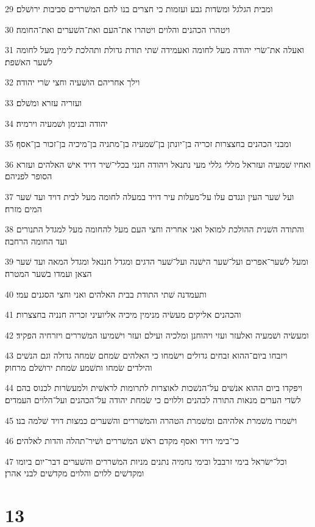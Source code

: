 \par 29 ומבית הגלגל ומשׂדות גבע ועזמות כי חצרים בנו להם המשׁררים סביבות ירושׁלם׃
\par 30 ויטהרו הכהנים והלוים ויטהרו את־העם ואת־השׁערים ואת־החומה׃
\par 31 ואעלה את־שׂרי יהודה מעל לחומה ואעמידה שׁתי תודת גדולת ותהלכת לימין מעל לחומה לשׁער האשׁפת׃
\par 32 וילך אחריהם הושׁעיה וחצי שׂרי יהודה׃
\par 33 ועזריה עזרא ומשׁלם׃
\par 34 יהודה ובנימן ושׁמעיה וירמיה׃
\par 35 ומבני הכהנים בחצצרות זכריה בן־יונתן בן־שׁמעיה בן־מתניה בן־מיכיה בן־זכור בן־אסף׃
\par 36 ואחיו שׁמעיה ועזראל מללי גללי מעי נתנאל ויהודה חנני בכלי־שׁיר דויד אישׁ האלהים ועזרא הסופר לפניהם׃
\par 37 ועל שׁער העין ונגדם עלו על־מעלות עיר דויד במעלה לחומה מעל לבית דויד ועד שׁער המים מזרח׃
\par 38 והתודה השׁנית ההולכת למואל ואני אחריה וחצי העם מעל להחומה מעל למגדל התנורים ועד החומה הרחבה׃
\par 39 ומעל לשׁער־אפרים ועל־שׁער הישׁנה ועל־שׁער הדגים ומגדל חננאל ומגדל המאה ועד שׁער הצאן ועמדו בשׁער המטרה׃
\par 40 ותעמדנה שׁתי התודת בבית האלהים ואני וחצי הסגנים עמי׃
\par 41 והכהנים אליקים מעשׂיה מנימין מיכיה אליועיני זכריה חנניה בחצצרות׃
\par 42 ומעשׂיה ושׁמעיה ואלעזר ועזי ויהוחנן ומלכיה ועילם ועזר וישׁמיעו המשׁררים ויזרחיה הפקיד׃
\par 43 ויזבחו ביום־ההוא זבחים גדולים וישׂמחו כי האלהים שׂמחם שׂמחה גדולה וגם הנשׁים והילדים שׂמחו ותשׁמע שׂמחת ירושׁלם מרחוק׃
\par 44 ויפקדו ביום ההוא אנשׁים על־הנשׁכות לאוצרות לתרומות לראשׁית ולמעשׂרות לכנוס בהם לשׂדי הערים מנאות התורה לכהנים וללוים כי שׂמחת יהודה על־הכהנים ועל־הלוים העמדים׃
\par 45 וישׁמרו משׁמרת אלהיהם ומשׁמרת הטהרה והמשׁררים והשׁערים כמצות דויד שׁלמה בנו׃
\par 46 כי־בימי דויד ואסף מקדם ראשׁ המשׁררים ושׁיר־תהלה והדות לאלהים׃
\par 47 וכל־ישׂראל בימי זרבבל ובימי נחמיה נתנים מניות המשׁררים והשׁערים דבר־יום ביומו ומקדשׁים ללוים והלוים מקדשׁים לבני אהרן׃

\chapter{13}

